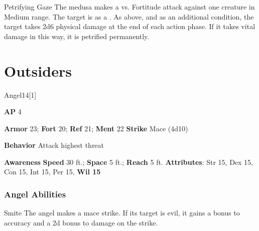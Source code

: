 \begin{ability}{Petrifying Gaze}
The medusa makes a  vs. Fortitude attack against one creature in Medium range.
\hit The target is  as a .
\crit As above, and as an additional condition, the target takes 2d6 physical damage at the end of each action phase.
If it takes vital damage in this way, it is petrified permanently.
\end{ability}





\section{Outsiders}

\begin{monsection}{Angel}{14}[1]
\vspace{-1em}\vspace{-1em}
\begin{spellcontent}
\begin{spelltargetinginfo}
{\textbf{AP} 4}

\pari \textbf{Armor} 23;
\textbf{Fort} 20;
\textbf{Ref} 21;
\textbf{Ment} 22
\pari \textbf{Strike} Mace  (4d10)



\pari \textbf{Behavior} Attack highest threat
\end{spelltargetinginfo}
\end{spellcontent}

\begin{monsterfooter}
\pari \textbf{Awareness} 
\pari \textbf{Speed} 30 ft.;
\textbf{Space} 5 ft.;
\textbf{Reach} 5 ft.
\pari \textbf{Attributes}:
Str 15,
Dex 15,
Con 15,
Int 15,
Per 15,
\textbf{Wil 15}
\end{monsterfooter}
\end{monsection}


\subsubsection{Angel Abilities}

\begin{ability}{Smite}
The angel makes a mace strike.
If its target is evil, it gains a  bonus to accuracy and a \plus2d bonus to damage on the strike.
\end{ability}

